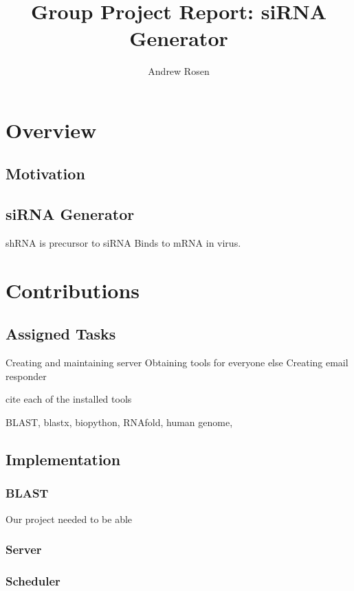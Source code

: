 \documentclass[10pt,letterpaper]{article}
\author{Andrew Rosen}
\title{Group Project Report: siRNA Generator}
\date{}
\begin{document}
\maketitle

\section{Overview}


\subsection{Motivation}

\subsection{siRNA  Generator}
shRNA is precursor to siRNA
Binds to mRNA in virus.

\section{Contributions}




\subsection{Assigned Tasks}




Creating and maintaining server
Obtaining tools for everyone else
Creating email responder

cite each of the installed tools

BLAST, blastx, biopython, RNAfold, human genome,

\subsection{Implementation}




\subsubsection{BLAST}

Our project needed to be able 


\subsubsection{Server}

\subsubsection{Scheduler}
\end{document}
